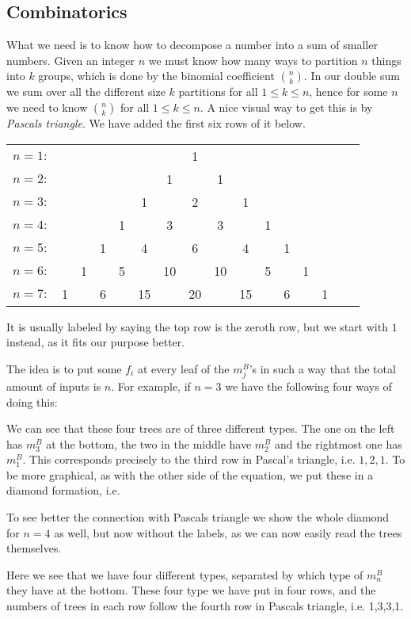 \subsection*{Combinatorics}

What we need is to know how to decompose a number into a sum of smaller numbers. Given an integer $n$ we must know how many ways to partition $n$ things into $k$ groups, which is done by the binomial coefficient $\binom{n}{k}$. In our double sum we sum over all the different size $k$ partitions for all $1\leq k\leq n$, hence for some $n$ we need to know $\binom{n}{k}$ for all $1\leq k\leq n$. A nice visual way to get this is by \emph{Pascals triangle}. We have added the first six rows of it below.

\begin{center}
\begin{tabular}{lccccccccccccccc}
$n=1 \colon$ &&&&&&&1&&&&&&\\
$n=2 \colon$ &&&&&&1&&1&&&&&\\
$n=3 \colon$ &&&&&1&&2&&1&&&&\\
$n=4 \colon$ &&&&1&&3&&3&&1&&&\\
$n=5 \colon$ &&&1&&4&&6&&4&&1&&\\
$n=6 \colon$ &&1&&5&&10&&10&&5&&1&\\
$n=7 \colon$ &1&&6&&15&&20&&15&&6&&1
\end{tabular}
\end{center}

It is usually labeled by saying the top row is the zeroth row, but we start with $1$ instead, as it fits our purpose better. 

The idea is to put some $f_i$ at every leaf of the $m_j^B$'s in such a way that the total amount of inputs is $n$. For example, if $n=3$ we have the following four ways of doing this:


We can see that these four trees are of three different types. The one on the left has $m_3^B$ at the bottom, the two in the middle have $m_2^B$ and the rightmost one has $m_1^B$. This corresponds precisely to the third row in Pascal's triangle, i.e. $1, 2, 1$. To be more graphical, as with the other side of the equation, we put these in a diamond formation, i.e.



To see better the connection with Pascals triangle we show the whole diamond for $n=4$ as well, but now without the labels, as we can now easily read the trees themselves.

Here we see that we have four different types, separated by which type of $m_n^B$ they have at the bottom. These four type we have put in four rows, and the numbers of trees in each row follow the fourth row in Pascals triangle, i.e. 1,3,3,1. 

